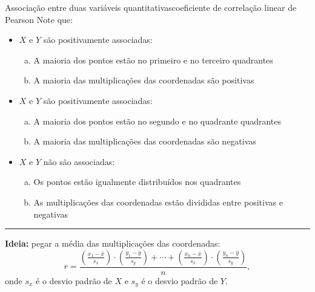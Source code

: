 \documentclass[
  10pt,
  ignorenonframetext,
]{beamer}
\providecommand{\tightlist}{%
  \setlength{\itemsep}{0pt}\setlength{\parskip}{0pt}}\usepackage{longtable,booktabs,array}
\newcommand*{\regrafina}{\rule{\textwidth}{0.5pt}}
\begin{document}
\begin{frame}{Associação entre duas variáveis
quantitativas\newline coeficiente de correlação linear de Pearson}
\protect\hypertarget{associauxe7uxe3o-entre-duas-variuxe1veis-quantitativascoeficiente-de-correlauxe7uxe3o-linear-de-pearson-1}{}
Note que:

\begin{itemize}
\tightlist
\item
  \(X\) e \(Y\) são positivamente associadas:

  \begin{enumerate}
  [a.]
  \tightlist
  \item
    A maioria dos pontos estão no primeiro e no terceiro quadrantes
  \item
    A maioria das multiplicações das coordenadas são positivas
  \end{enumerate}
\item
  \(X\) e \(Y\) são positivamente associadas:

  \begin{enumerate}
  [a.]
  \tightlist
  \item
    A maioria dos pontos estão no segundo e no quadrante quadrantes
  \item
    A maioria das multiplicações das coordenadas são negativas
  \end{enumerate}
\item
  \(X\) e \(Y\) não são associadas:

  \begin{enumerate}
  [a.]
  \tightlist
  \item
    Os pontos estão igualmente distribuídos nos quadrantes
  \item
    As multiplicações das coordenadas estão divididas entre positivas e
    negativas
  \end{enumerate}
\end{itemize}

\regrafina

\textbf{Ideia:} pegar a média das multiplicações das coordenadas: \[
r = \frac{\left( \frac{x_1 - \bar{x}}{s_x} \right)\cdot \left( \frac{y_1 - \bar{y}}{s_y} \right) + \cdots + \left( \frac{x_n - \bar{x}}{s_x} \right)\cdot \left( \frac{y_n - \bar{y}}{s_y} \right)}{n},
\] onde \(s_x\) é o desvio padrão de \(X\) e \(s_y\) é o desvio padrão
de \(Y\).
\end{frame}
\end{document}

